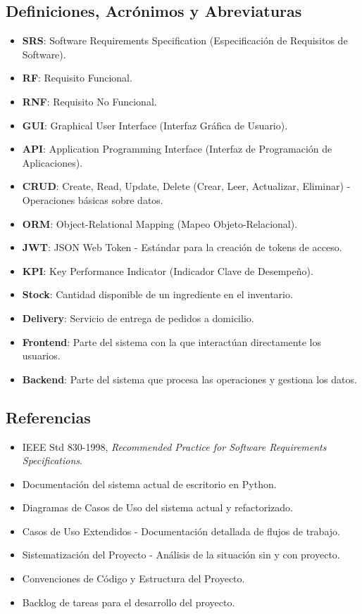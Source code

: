 \documentclass[12pt]{article}
\begin{document}
\subsection{Definiciones, Acrónimos y Abreviaturas}
\begin{itemize}
  \item \textbf{SRS}: Software Requirements Specification (Especificación de Requisitos de Software).
  \item \textbf{RF}: Requisito Funcional.
  \item \textbf{RNF}: Requisito No Funcional.
  \item \textbf{GUI}: Graphical User Interface (Interfaz Gráfica de Usuario).
  \item \textbf{API}: Application Programming Interface (Interfaz de Programación de Aplicaciones).
  \item \textbf{CRUD}: Create, Read, Update, Delete (Crear, Leer, Actualizar, Eliminar) - Operaciones básicas sobre datos.
  \item \textbf{ORM}: Object-Relational Mapping (Mapeo Objeto-Relacional).
  \item \textbf{JWT}: JSON Web Token - Estándar para la creación de tokens de acceso.
  \item \textbf{KPI}: Key Performance Indicator (Indicador Clave de Desempeño).
  \item \textbf{Stock}: Cantidad disponible de un ingrediente en el inventario.
  \item \textbf{Delivery}: Servicio de entrega de pedidos a domicilio.
  \item \textbf{Frontend}: Parte del sistema con la que interactúan directamente los usuarios.
  \item \textbf{Backend}: Parte del sistema que procesa las operaciones y gestiona los datos.
\end{itemize}

\subsection{Referencias}
\begin{itemize}
  \item IEEE Std 830-1998, \emph{Recommended Practice for Software Requirements Specifications}.
  \item Documentación del sistema actual de escritorio en Python.
  \item Diagramas de Casos de Uso del sistema actual y refactorizado.
  \item Casos de Uso Extendidos - Documentación detallada de flujos de trabajo.
  \item Sistematización del Proyecto - Análisis de la situación sin y con proyecto.
  \item Convenciones de Código y Estructura del Proyecto.
  \item Backlog de tareas para el desarrollo del proyecto.
\end{itemize}
\end{document}

